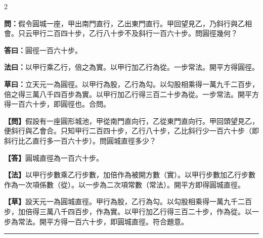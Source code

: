 \documentclass[11pt,a4paper]{article}
\newcommand{\longline}{\noindent\rule{\textwidth}{0.4pt}}
\newcommand{\wenC}[1]{\par\noindent\textbf{\textcolor{probcolor}{問：}}{#1}\par}
\newcommand{\daC}[1]{\par\noindent\textbf{\textcolor{anscolor}{答曰：}}{#1}\par}
\newcommand{\fayueC}[1]{\par\noindent\textbf{\textcolor{methodcolor}{法曰：}}{#1}\par}
\newcommand{\caoyueC}[1]{\par\noindent\textbf{草曰：}{#1}\par}
\newcommand{\wenM}[1]{\par\noindent\textbf{\textcolor{probcolor}{【問】}}{#1}\par}
\newcommand{\daM}[1]{\par\noindent\textbf{\textcolor{anscolor}{【答】}}{#1}\par}
\newcommand{\fayueM}[1]{\par\noindent\textbf{\textcolor{methodcolor}{【法】}}{#1}\par}
\newcommand{\caoyueM}[1]{\par\noindent\textbf{【草】}{#1}\par}
\begin{document}
\begin{paracol}{2}

\wenC{假令圓城一座，甲出南門直行，乙出東門直行。甲回望見乙，乃斜行與乙相會。只云甲行二百四十步，乙行八十步不及斜行一百六十步。問圓徑幾何？}

\daC{圓徑一百六十步。}

\fayueC{以甲行乘乙行，倍之為實。以甲行加乙行為從。一步常法。開平方得圓徑。}

\caoyueC{立天元一為圓徑。以甲行為股，乙行為勾。以勾股相乘得一萬九千二百步，倍之得三萬八千四百步為實。以甲行加乙行得三百二十步為從。一步常法。開平方得一百六十步，即圓徑也。合問。}

\switchcolumn

\wenM{假設有一座圓形城池，甲從南門直向行，乙從東門直向行。甲回頭望見乙，便斜行與乙會合。只知甲行二百四十步，乙行八十步，乙比斜行少一百六十步（即斜行比乙直行多一百六十步）。問圓城直徑多少？}

\daM{圓城直徑為一百六十步。}

\fayueM{以甲行步數乘乙行步數，加倍作為被開方數（實）。以甲行步數加乙行步數作為一次項係數（從）。以一步為二次項常數（常法）。開平方即得圓城直徑。}

\caoyueM{設天元一為圓城直徑。甲行為股，乙行為勾。以勾股相乘得一萬九千二百步，加倍得三萬八千四百步，作為實。以甲行加乙行得三百二十步，作為從。以一步為常法。開平方得一百六十步，即圓城直徑。符合題意。}

\end{paracol}

\vspace{0.3cm}
\longline
\end{document}
